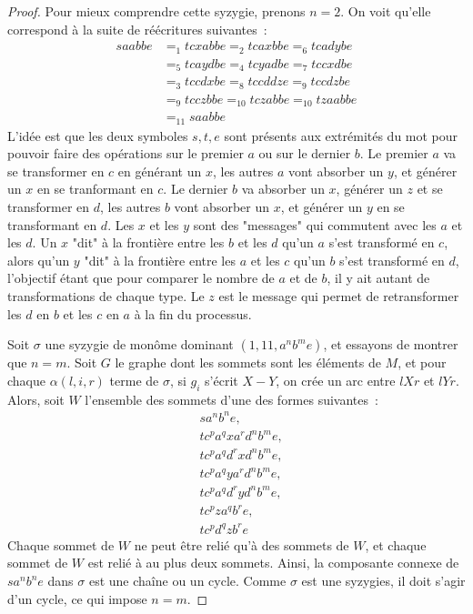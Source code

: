 \documentclass{article}
\begin{document}
\begin{proof}
Pour mieux comprendre cette syzygie, prenons $n = 2$. On voit qu'elle correspond à la suite de réécritures suivantes~:
\begin{align*}
saabbe & =_{1} tcxabbe =_{2} tcaxbbe =_{6} tcadybe \\
& =_{5} tcaydbe =_{4} tcyadbe =_{7} tccxdbe \\
& =_{3} tccdxbe =_{8} tccddze =_{9} tccdzbe \\
& =_{9} tcczbbe =_{10} tczabbe =_{10} tzaabbe \\
& =_{11} saabbe
\end{align*}
L'idée est que les deux symboles $s, t, e$ sont présents aux extrémités du mot pour pouvoir faire des opérations sur le premier $a$ ou sur le dernier $b$.
Le premier $a$ va se transformer en $c$ en générant un $x$, les autres $a$ vont absorber un $y$, et générer un $x$ en se tranformant en $c$.
Le dernier $b$ va absorber un $x$, générer un $z$ et se transformer en $d$, les autres $b$ vont absorber un $x$, et générer un $y$ en se transformant en $d$.
Les $x$ et les $y$ sont des "messages" qui commutent avec les $a$ et les $d$. Un $x$ "dit" à la frontière entre les $b$ et les $d$ qu'un $a$ s'est transformé en $c$, alors qu'un $y$ "dit" à la frontière entre les $a$ et les $c$ qu'un $b$ s'est transformé en $d$, l'objectif étant que pour comparer le nombre de $a$ et de $b$, il y ait autant de transformations de chaque type.
Le $z$ est le message qui permet de retransformer les $d$ en $b$ et les $c$ en $a$ à la fin du processus.

Soit $\sigma$ une syzygie de monôme dominant $(1, 11, a^{n}b^{m}e)$, et essayons de montrer que $n = m$.
Soit $G$ le graphe dont les sommets sont les éléments de $M$, et pour chaque $\alpha(l, i, r)$ terme de $\sigma$, si $g_i$ s'écrit $X - Y$, on crée un arc entre $lXr$ et $lYr$.
Alors, soit $W$ l'ensemble des sommets d'une des formes suivantes~:
\begin{align*}
& sa^nb^ne, \\
& tc^pa^qxa^rd^nb^me, \\
& tc^pa^qd^rxd^nb^me, \\
& tc^pa^qya^rd^nb^me, \\
& tc^pa^qd^ryd^nb^me, \\
& tc^pza^qb^re, \\
& tc^pd^qzb^re
\end{align*}
Chaque sommet de $W$ ne peut être relié qu'à des sommets de $W$, et chaque sommet de $W$ est relié à au plus deux sommets. Ainsi, la composante connexe de $sa^nb^ne$ dans $\sigma$ est une chaîne ou un cycle. Comme $\sigma$ est une syzygies, il doit s'agir d'un cycle, ce qui impose $n = m$.

\end{proof}
\end{document}
